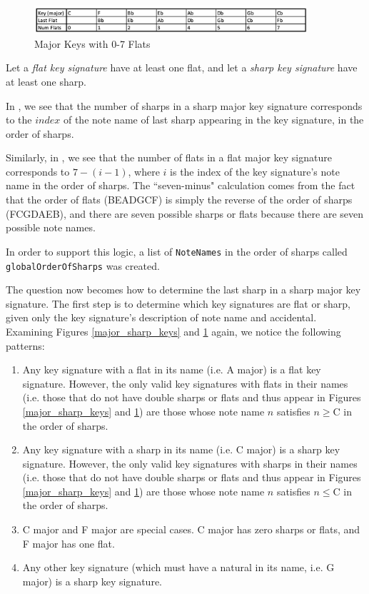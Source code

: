\documentclass{report}
\begin{document}
\begin{figure}[h!]
\centering
\includegraphics[width=0.9\textwidth]{images/major_flat}
\caption{Major Keys with 0-7 Flats}
\label{major_flat_keys}
\end{figure}

\newpage

Let a \textit{flat key signature} have at least one flat, and let a \textit{sharp key signature} have at least one sharp.

In , we see that the number of sharps in a sharp major key signature corresponds to the $index$ of the note name of last sharp appearing in the key signature, in the order of sharps. 

Similarly, in , we see that the number of flats in a flat major key signature corresponds to $7-(i-1)$, where $i$ is the index of the key signature's note name in the order of sharps. The ``seven-minus" calculation comes from the fact that the order of flats (BEADGCF) is simply the reverse of the order of sharps (FCGDAEB), and there are seven possible sharps or flats because there are seven possible note names. 

In order to support this logic, a list of \verb.NoteNames. in the order of sharps called \verb.globalOrderOfSharps. was created.

The question now becomes how to determine the last sharp in a sharp major key signature. The first step is to determine which key signatures are flat or sharp, given only the key signature's description of note name and accidental. Examining Figures \ref{major_sharp_keys} and \ref{major_flat_keys} again, we notice the following patterns:
\begin{enumerate}
\item  Any key  signature with a flat in its name (i.e. A\musFlat \; major) is a flat key signature. However, the only valid key signatures with flats in their names (i.e. those that do not have double sharps or flats and thus appear in Figures \ref{major_sharp_keys} and \ref{major_flat_keys}) are those whose note name $n$ satisfies $n \geq $\;C in the order of sharps.
\item  Any key  signature with a sharp in its name (i.e. C\musSharp \; major) is a sharp key signature. However, the only valid key signatures with sharps in their names (i.e. those that do not have double sharps or flats and thus appear in Figures \ref{major_sharp_keys} and \ref{major_flat_keys}) are those whose note name $n$ satisfies $n \leq $\;C in the order of sharps.
\item  C major and F major are special cases. C major has zero sharps or flats, and F  major has one flat.
\item  Any other key signature (which must have a natural in its name, i.e. G major) is a sharp key signature.
\end{enumerate}
\end{document}
